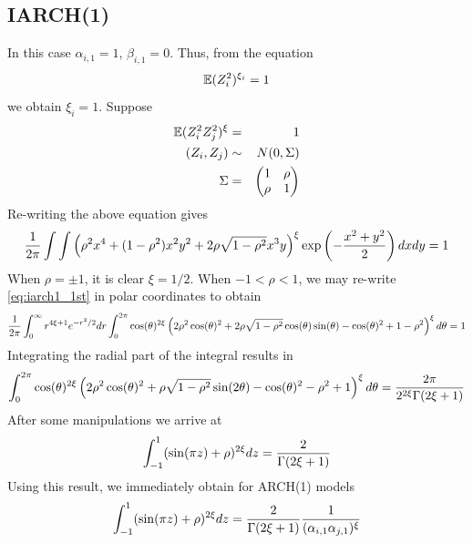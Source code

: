 \documentclass{article}
\begin{document}
\subsection{IARCH(1)}
In this case $\alpha_{i, 1} = 1$, $\beta_{i, 1} = 0$. Thus, from the equation
\begin{equation*}
  \mathbb{E} (Z_i^2)^{\xi_i} = 1
\end{equation*}
we obtain $\xi_i = 1$. Suppose
\begin{eqnarray*}
  \mathbb{E} (Z_i^2 Z_j^2)^\xi &=& 1 \\
  (Z_i, Z_j) &\sim& N(0, \Sigma) \\
  \Sigma &=&
  \begin{pmatrix}
    1 & \rho \\
    \rho & 1
  \end{pmatrix}
\end{eqnarray*}
Re-writing the above equation gives
\begin{equation}
  \label{eq:iarch1_1st}
  {1 \over 2\pi}
  \int \int
  \left(
    \rho^2 x^4 + (1 - \rho^2) x^2 y^2 + 2 \rho \sqrt{1 - \rho^2} x^3 y
  \right)^\xi
  \exp\left(
    -{x^2 + y^2 \over 2}
  \right)
  dx dy = 1
\end{equation}
When $\rho = \pm 1$, it is clear $\xi = 1/2$. When $-1 < \rho < 1$,
we may re-write \eqref{eq:iarch1_1st} in polar coordinates to obtain
\begin{equation*}
  {1 \over 2\pi} \int_0^{\infty} r^{4\xi + 1} e^{-r^2 / 2} dr
  \int_{0}^{2\pi} \cos(\theta)^{2 \xi}
  \left(
    2 \rho^2 \cos(\theta)^2
    + 2 \rho \sqrt{1 - \rho^2} \cos(\theta) \sin(\theta) - \cos(\theta)^2 + 1 - \rho^2
  \right)^\xi d\theta = 1
\end{equation*}
Integrating the radial part of the integral results in
\begin{equation*}
  \int_{0}^{2\pi}
  \cos(\theta)^{2\xi}
  \left(
    2 \rho^2 \cos(\theta)^2 + \rho \sqrt{1 - \rho^2} \sin(2\theta) - \cos(\theta)^2 - \rho^2 + 1
  \right)^\xi d\theta
  = {2 \pi
    \over
    2^{2 \xi} \Gamma(2\xi + 1)
  }
\end{equation*}
After some manipulations we arrive at
\begin{equation}
  \label{eq:iarch_2nd}
  \int_{-1}^1 (\sin(\pi z) + \rho)^{2\xi} dz = {2 \over \Gamma(2\xi + 1)}
\end{equation}
Using this result, we immediately obtain for ARCH(1) models
\begin{equation*}
  \label{eq:arch_1st}
  \int_{-1}^1 (\sin(\pi z) + \rho)^{2\xi} dz =
  {2 \over \Gamma(2\xi + 1)}
  {1 \over (\alpha_{i, 1} \alpha_{j, 1})^\xi}
\end{equation*}
\end{document}
